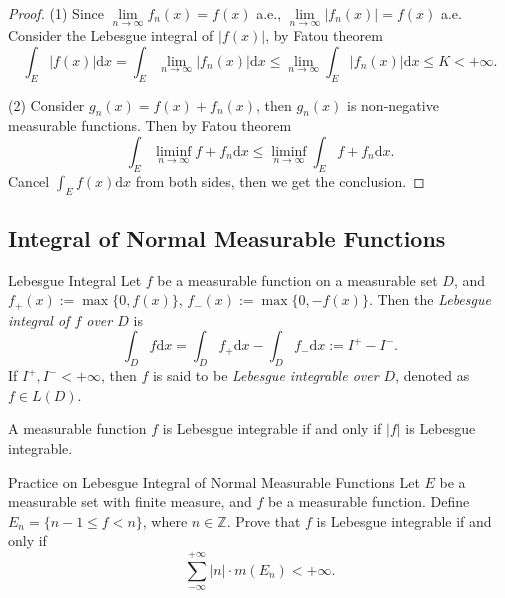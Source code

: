 \begin{proof}
  (1) Since $\lim \limits _{n \rightarrow \infty} f_n(x) = f(x)$ a.e.,
  $\lim \limits _{n \rightarrow \infty} |f_n(x)| = f(x)$ a.e.
  Consider the Lebesgue integral of $|f(x)|$, by Fatou theorem
  \begin{equation}
    \int_E |f(x)|\mathrm{d} x = \int_E \lim \limits _{n \rightarrow \infty} |f_n(x)| \mathrm{d} x
    \leq \lim \limits _{n \rightarrow \infty} \int_E |f_n(x)|\mathrm{d} x \leq K < +\infty.
  \end{equation}

  (2) Consider $g_n(x) = f(x) + f_n(x)$, then $g_n(x)$ is non-negative measurable functions.
  Then by Fatou theorem
  \begin{equation}
    \int_E \liminf_{n \rightarrow \infty} f + f_n \mathrm{d} x
    \leq \liminf_{n \rightarrow \infty} \int_E f + f_n \mathrm{d} x.
  \end{equation}
  Cancel $\int_E f(x)\mathrm{d} x$ from both sides, then we get the conclusion.
\end{proof}

\subsection{Integral of Normal Measurable Functions}

\begin{definition}{Lebesgue Integral}{}
  Let $f$ be a measurable function on a measurable set $D$,
  and $f_+(x) := \max\{0, f(x)\}$, $f_-(x) := \max\{0, -f(x)\}$.
  Then the \emph{Lebesgue integral of $f$ over $D$} is
  \begin{equation}
    \int_D f \mathrm{d} x 
    = \int_D f_+ \mathrm{d} x - \int_D f_-\mathrm{d} x
    := I^+ - I^-.
  \end{equation}
  If $I^+, I^- < +\infty$, then $f$ is said to be \emph{Lebesgue integrable over
    $D$}, denoted as $f \in L(D)$.
\end{definition}

\begin{note}
  A measurable function $f$ is Lebesgue integrable if and only if $|f|$
  is Lebesgue integrable.
\end{note}

\begin{example}{Practice on Lebesgue Integral of Normal Measurable Functions}{}
  Let $E$ be a measurable set with finite measure, and $f$ be a measurable function.
  Define $E_n = \{n - 1 \leq f < n\}$, where $n \in \mathbb{Z}$.
  Prove that $f$ is Lebesgue integrable if and only if
  \begin{equation}
    \sum\limits_{- \infty}^{+\infty} |n| \cdot m(E_n) < +\infty.
  \end{equation}
\end{example}

